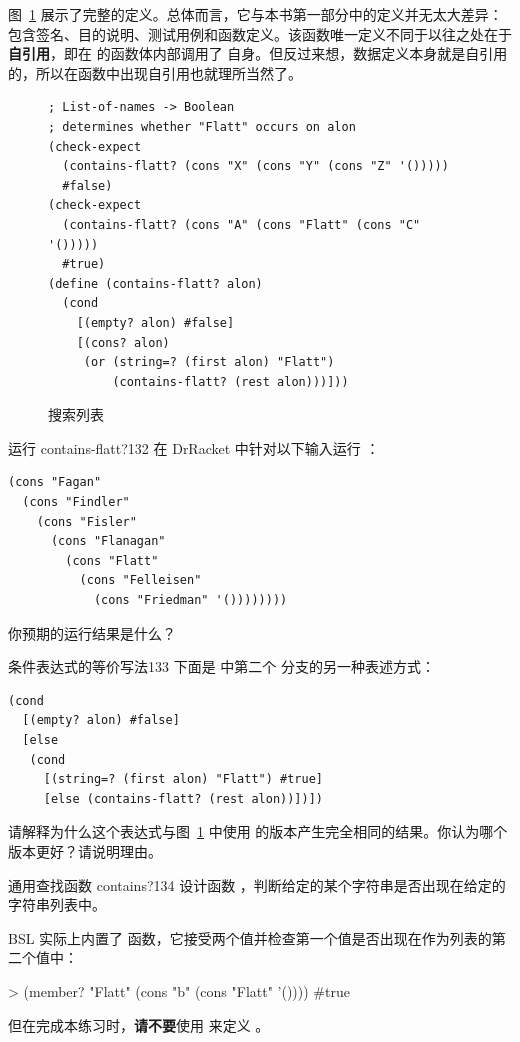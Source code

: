 图~\ref{fig:searching_a_list} 展示了完整的定义。总体而言，它与本书第一部分中的定义并无太大差异：包含签名、目的说明、测试用例和函数定义。该函数唯一定义不同于以往之处在于\textbf{自引用}，即在  的函数体内部调用了  自身。但反过来想，数据定义本身就是自引用的，所以在函数中出现自引用也就理所当然了。

\begin{figure}[htbp]
  \centering
\begin{lstlisting}[language=BSL, basicstyle=\scriptsize\ttfamily]
; List-of-names -> Boolean
; determines whether "Flatt" occurs on alon
(check-expect
  (contains-flatt? (cons "X" (cons "Y" (cons "Z" '()))))
  #false)
(check-expect
  (contains-flatt? (cons "A" (cons "Flatt" (cons "C" '()))))
  #true)
(define (contains-flatt? alon)
  (cond
    [(empty? alon) #false]
    [(cons? alon)
     (or (string=? (first alon) "Flatt")
         (contains-flatt? (rest alon)))]))
\end{lstlisting}
  \caption{搜索列表}
  \label{fig:searching_a_list}
\end{figure}

\begin{exercise}{运行 contains-flatt?}{132}
在 DrRacket 中针对以下输入运行 ：
\begin{lstlisting}[language=BSL]
(cons "Fagan"
  (cons "Findler"
    (cons "Fisler"
      (cons "Flanagan"
        (cons "Flatt"
          (cons "Felleisen"
            (cons "Friedman" '())))))))
\end{lstlisting}
你预期的运行结果是什么？
\end{exercise}

\begin{exercise}{条件表达式的等价写法}{133}
下面是  中第二个  分支的另一种表述方式：
\begin{lstlisting}[language=BSL]
(cond
  [(empty? alon) #false]
  [else
   (cond
     [(string=? (first alon) "Flatt") #true]
     [else (contains-flatt? (rest alon))])])
\end{lstlisting}
请解释为什么这个表达式与图~\ref{fig:searching_a_list} 中使用  的版本产生完全相同的结果。你认为哪个版本更好？请说明理由。
\end{exercise}

\begin{exercise}{通用查找函数 contains?}{134}
设计函数 ，判断给定的某个字符串是否出现在给定的字符串列表中。

\begin{notebox}[提示]
BSL 实际上内置了  函数，它接受两个值并检查第一个值是否出现在作为列表的第二个值中：
\begin{replbox}
> (member? "Flatt" (cons "b" (cons "Flatt" '())))
#true
\end{replbox}
但在完成本练习时，\textbf{请不要}使用  来定义 。
\end{notebox}
\end{exercise}

